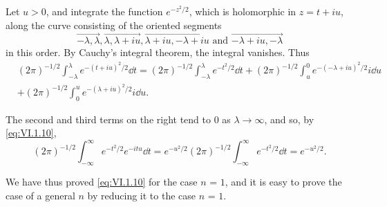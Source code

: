 Let $u > 0$, and integrate the function $e^{-z^2/2}$, which is holomorphic in $z = t + iu$, along the curve consisting of the oriented segments 
\[
\overrightarrow {- \lambda , \lambda}, \overrightarrow {\lambda , \lambda + i u}, \overrightarrow {\lambda + i u , - \lambda + i u} \text{ and } \overrightarrow {- \lambda + i u , - \lambda}
\]
in this order. By Cauchy's integral theorem, the integral vanishes. Thus 
\[
\begin{aligned}
&(2 \pi) ^{-1/2} \int_{- \lambda} ^{\lambda} e ^ {- (t + i u) ^{2} / 2} \dd t = (2 \pi) ^{-1/2} \int_{- \lambda} ^{\lambda} e ^ {- t ^{2} / 2} \dd t + (2 \pi) ^{-1/2} \int_{u} ^{0} e ^ {- (- \lambda + i u) ^{2} / 2} i \dd u
\\
&+ (2 \pi) ^{-1/2} \int_{0} ^{u} e ^ {- (\lambda + i u) ^{2} / 2} i \dd u.
\end{aligned}
\]

The second and third terms on the right tend to $0$ as $\lambda \to \infty$, and so, by \eqref{eq:VI.1.10}, 
\[
(2 \pi) ^{-1/2} \int_{- \infty} ^{\infty} e ^ {- t ^{2} / 2} e ^{-itu} \dd t = e ^ {- u ^{2} / 2} (2 \pi) ^{-1/2} \int_{- \infty} ^{\infty} e ^ {- t ^{2} / 2} \dd t = e ^ {- u ^{2} / 2}.
\]

We have thus proved \eqref{eq:VI.1.10} for the case $n$ = $1$, and it is easy to prove the case of a general $n$ by reducing it to the case $n$ = $1$. 

